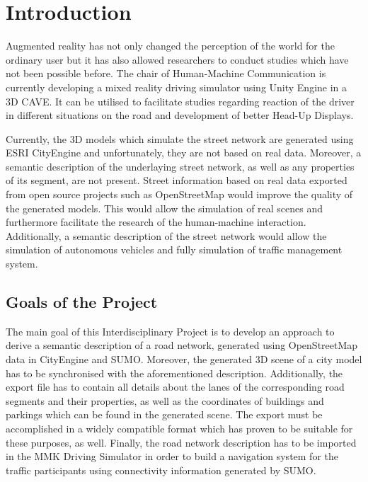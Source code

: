 \chapter{Introduction}
\label{ch:introduction}
 
Augmented reality has not only changed the perception of the world for the ordinary user but it has also allowed researchers to conduct studies which have not been possible before. The chair of Human-Machine Communication is currently developing a mixed reality driving simulator using Unity Engine in a 3D CAVE. It can be utilised to facilitate studies regarding reaction of the driver in different situations on the road and development of better Head-Up Displays.

Currently, the 3D models which simulate the street network are generated using ESRI CityEngine and unfortunately, they are not based on real data. Moreover, a semantic description of the underlaying street network, as well as any properties of its segment, are not present. Street information based on real data exported from open source projects such as OpenStreetMap would improve the quality of the generated models. This would allow the simulation of real scenes and furthermore facilitate the research of the human-machine interaction. Additionally, a semantic description of the street network would allow the simulation of autonomous vehicles and fully simulation of traffic management system. 
 
\section{Goals of the Project}
\label{sec:goals}
The main goal of this Interdisciplinary Project is to develop an approach to derive a semantic description of a road network, generated using OpenStreetMap data in CityEngine and SUMO. Moreover, the generated 3D scene of a city model has to be synchronised with the aforementioned description. Additionally, the export file has to contain all details about the lanes of the corresponding road segments and their properties, as well as the coordinates of buildings and parkings which can be found in the generated scene. The export must be accomplished in a widely compatible format which has proven to be suitable for these purposes, as well. Finally, the road network description has to be imported in the MMK Driving Simulator in order to build a navigation system for the traffic participants using connectivity information generated  by SUMO.

